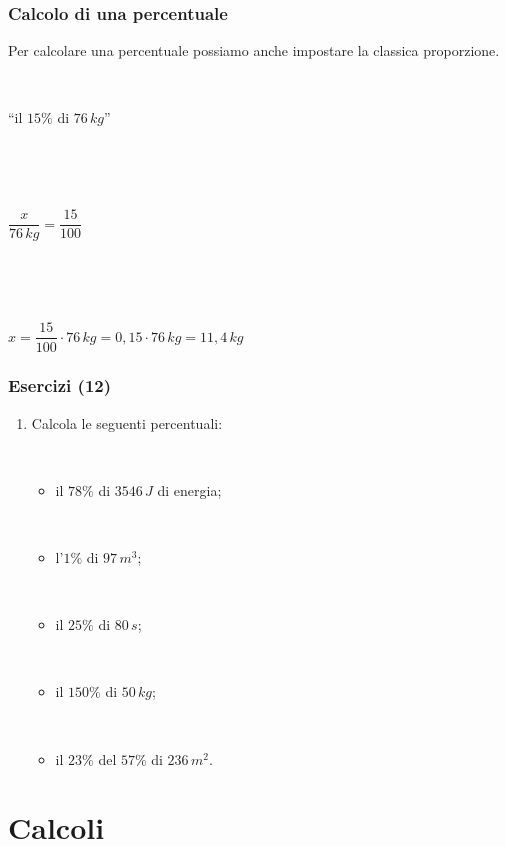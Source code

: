 \documentclass[]{beamer}
\begin{document}
\begin{frame}
\frametitle{Calcolo di una percentuale}
Per calcolare una percentuale possiamo anche impostare la classica \alert{proporzione}.\pause

~

\begin{center}
``il $ 15\% $ di $ 76 \, kg $''

~

~

$\dfrac{x}{76 \, kg} = \dfrac{15}{100}  $\pause

~

~

$ x = \dfrac{15}{100}\cdot 76 \, kg= 0,15\cdot 76 \, kg = 11,4 \, kg $
\end{center}
\end{frame}


\begin{frame}
\frametitle{Esercizi (12)}
\begin{enumerate}
  \item Calcola le seguenti percentuali:
  
  ~
        
    \begin{itemize}
        \item il $ 78\% $ di $ 3546 \, J $ di energia;

        ~

        \item l'$ 1\% $ di $ 97 \, m^3 $;
        
        ~
        
        \item il $ 25\% $ di $ 80 \, s $;
        
        ~
        
        \item il $ 150\% $ di $ 50 \, kg $;
        
        ~
        
        \item il $ 23\% $ del $ 57\% $ di $ 236 \, m^2 $.
    \end{itemize}
\end{enumerate}
\end{frame}

\section{Calcoli}
\end{document}
